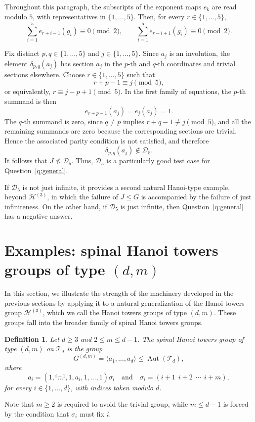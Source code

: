 \documentclass[11pt,leqno]{amsart}
\theoremstyle{plain}
\newtheorem{definition}[definition]{Definition}
\newcommand\T{{\mathcal{T}}}
\DeclareMathOperator{\Aut}{Aut}
\newcommand{\Dfive}{\mathcal D_{5}}
\newcommand{\fc}[1]{\textcolor{teal}{#1}}
\numberwithin{equation}{section}
\begin{document}
Throughout this paragraph, the subscripts of the exponent maps $e_k$
are read modulo $5$, with representatives in $\{1,\ldots,5\}$. Then,
for every $r\in\{1,\ldots,5\}$,
\[
\sum_{i=1}^{5} e_{r+i-1}(g_i)\equiv 0\pmod 2,
\qquad
\sum_{i=1}^{5} e_{r-i+1}(g_i)\equiv 0\pmod 2.
\]

Fix distinct $p,q\in\{1,\ldots,5\}$ and
$j\in\{1,\ldots,5\}$. Since $a_j$ is an involution, the element
$\delta_{p,q}(a_j)$ has section $a_j$ in the $p$-th and $q$-th
coordinates and trivial sections elsewhere. Choose
$r\in\{1,\ldots,5\}$ such that
\[
r+p-1\equiv j\pmod 5,
\]
or equivalently, $r\equiv j-p+1\pmod 5$. In the first family of
equations, the $p$-th summand is then
\[
e_{r+p-1}(a_j)=e_j(a_j)=1.
\]
The $q$-th summand is zero, since $q\neq p$ implies
$r+q-1\not\equiv j\pmod 5$, and all the remaining summands are zero
because the corresponding sections are trivial. Hence the associated
parity condition is not satisfied, and therefore
\[
\delta_{p,q}(a_j)\notin\Dfive.
\]
It follows that $J\nleq\Dfive$. Thus, $\Dfive$ is a particularly good
test case for Question~\ref{q:general}.

If $\Dfive$ is not just infinite, it provides a second natural
Hanoi-type example, beyond $\mathcal{H}^{(3)}$, in which the failure
of $J\leq G$ is accompanied by the failure of just infiniteness. On
the other hand, if $\Dfive$ is just infinite, then
Question~\ref{q:general} has a negative answer.



\section{Examples: spinal Hanoi towers groups of type $(d,m)$}\label{sec:examples}
In this section, we illustrate the strength of the machinery developed in the previous sections by applying it to a natural generalization of the Hanoi towers group $\mathcal{H}^{(3)}$, which we call the Hanoi towers groups of type $(d,m)$. These groups fall into the broader family of spinal Hanoi towers groups.

\begin{definition}\label{def:typem}
Let $d\geq 3$ and $2\leq m\leq d-1$. The \emph{spinal Hanoi towers group of type $(d,m)$ on $\T_d$} is the group
\[
G^{(d,m)}=\langle a_1,\dots,a_d\rangle\leq \Aut(\T_d),
\]
where
\[
a_i=(1,\stackrel{i-1}{\dots},1,a_i,1,\dots,1)\sigma_i
\quad\text{and}\quad \sigma_i=(i+1\ \ i+2\ \ \cdots\ \ i+m),
\]
for every $i\in\{1,\dots,d\}$, with indices taken modulo $d$.
\end{definition}
Note that $m\geq 2$ is required to avoid the trivial group, while $m\leq d-1$ is forced by the condition that $\sigma_{i}$ must fix $i$.
\end{document}
